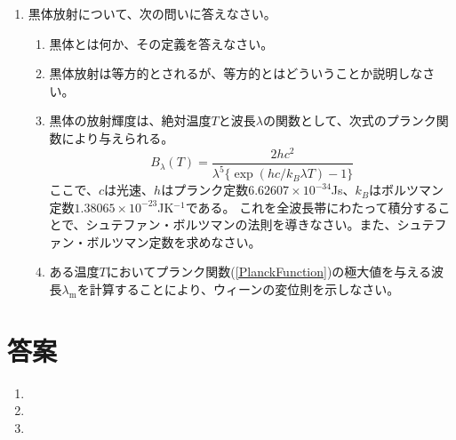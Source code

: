 \documentclass{jsarticle}
\newenvironment{problems}
{
  \renewcommand\labelenumi{\doublebox{\arabic{enumi}}}
  \begin{enumerate}
}{
  \end{enumerate}
  \renewcommand\labelenumi{\arabic{enumi}.}
}
\begin{document}
\begin{problems}
    \item 黒体放射について、次の問いに答えなさい。
        \begin{enumerate}[(1)]
        \item 黒体とは何か、その定義を答えなさい。
        \item 黒体放射は等方的とされるが、等方的とはどういうことか説明しなさい。
        \item 黒体の放射輝度は、絶対温度$T$と波長$\lambda$の関数として、次式のプランク関数により与えられる。
        \begin{equation}
        B_{\lambda}(T)=\frac{2hc^2}{\lambda^5\{\exp(hc/k_B\lambda T)-1\}} \label{PlanckFunction}
        \end{equation}
        ここで、$c$は光速、$h$はプランク定数$6.62607\times 10^{-34}$Js、$k_B$はボルツマン定数$1.38065\times 10^{-23}$JK$^{-1}$である。
        これを全波長帯にわたって積分することで、シュテファン・ボルツマンの法則を導きなさい。また、シュテファン・ボルツマン定数を求めなさい。
        \item ある温度$T$においてプランク関数(\ref{PlanckFunction})の極大値を与える波長$\lambda _\mathrm{m}$を計算することにより、ウィーンの変位則を示しなさい。
        \end{enumerate}
\end{problems}

\section{答案}
\begin{problems}
\item 

\item 

\item 

\end{problems}
\end{document}
